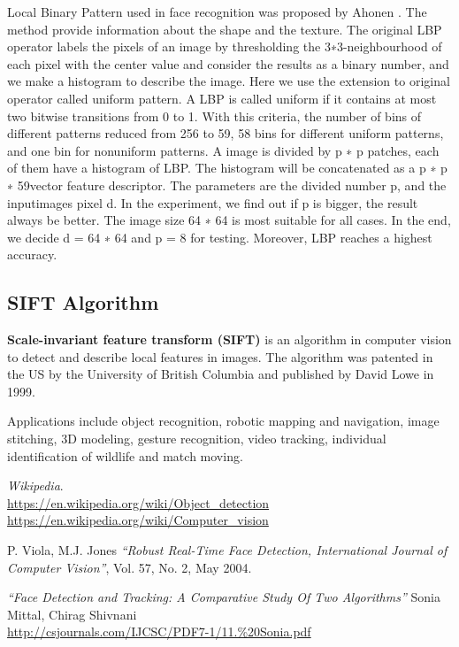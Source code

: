 \documentclass[a4paper,12pt]{report}
\begin{document}
\begin{itemize}
\begin{itemize}
\begin{itemize}
		Local Binary Pattern used in face recognition was proposed by Ahonen . The method provide information about the shape and the texture. The original LBP operator labels the pixels of an image by thresholding the 3∗3-neighbourhood of each pixel with the center value and consider the results as a binary number, and we make a histogram to describe the image. Here we use the extension to original operator called uniform pattern. A LBP is called uniform if it contains at most two bitwise transitions from 0 to 1. With this criteria, the number of bins of different patterns reduced from 256 to 59, 58 bins for different uniform patterns, and one bin for nonuniform patterns. A image is divided by p ∗ p patches, each of them have a histogram of LBP. The histogram will be concatenated as a p ∗ p ∗ 59vector feature descriptor.
		The parameters are the divided number p, and the inputimages pixel d. In the experiment, we find out if p is bigger, the result always be better. The image size 64 ∗ 64 is most suitable for all cases. In the end, we decide d = 64 ∗ 64 and p = 8 for testing. Moreover, LBP reaches a highest accuracy.
		
		\subsection{SIFT Algorithm}
		
		\textbf{Scale-invariant feature transform (SIFT)} is an algorithm in computer vision to detect and describe local features in images. The algorithm was patented in the US by the University of British Columbia \cite{uspatent_sift} and published by David Lowe in 1999.\cite{Lowe_David}

		Applications include object recognition, robotic mapping and navigation, image stitching, 3D modeling, gesture recognition, video tracking, individual identification of wildlife and match moving.
		
	
	

\begin{thebibliography}{9}
    \textit{Wikipedia}.\\
    \url{https://en.wikipedia.org/wiki/Object_detection} \\
    \url{https://en.wikipedia.org/wiki/Computer_vision}
    
    P. Viola,  M.J. Jones
    \textit{``Robust  Real-Time  Face  Detection,  International Journal  of  Computer Vision''}, Vol.  57, No. 2, May 2004.
    
    \textit{``Face Detection and Tracking: A Comparative Study Of Two Algorithms''}
    Sonia Mittal, Chirag Shivnani\\
    \url{http://csjournals.com/IJCSC/PDF7-1/11.\%20Sonia.pdf}
    

\end{thebibliography}
\end{itemize}
\end{itemize}
\end{itemize}
\end{document}
